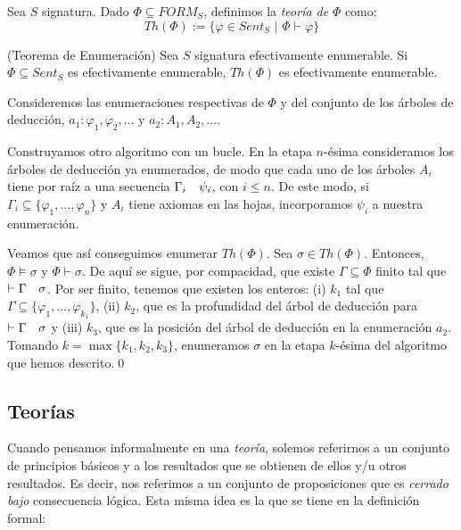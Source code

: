 \begin{definition}
Sea $S$ signatura. Dado $\Phi \subseteq FORM_S$, definimos la \textit{teoría de} $\Phi$ como:
$$Th(\Phi) := \{\varphi \in Sent_S \, \, | \, \, \Phi \vdash \varphi\}$$
\end{definition}

\begin{theorem*}(Teorema de Enumeración)
Sea $S$ signatura efectivamente enumerable. Si $\Phi \subseteq Sent_S$ es efectivamente enumerable, $Th(\Phi)$ es efectivamente enumerable.
\end{theorem*}


\begin{sketchproof}
Consideremos las enumeraciones respectivas de $\Phi$ y del conjunto de los árboles de deducción, $a_1: \varphi_1, \varphi_2, \dots$ y $a_2:A_1, A_2, \dots$.

Construyamos otro algoritmo con un bucle. En la etapa $n$-ésima consideramos los árboles de deducción ya enumerados, de modo que cada uno de los árboles $A_i$ tiene por raíz a una secuencia $\Gamma_i \quad \psi_i$, con $i \leq n$. De este modo, si $\Gamma_i \subseteq \{\varphi_1, \dots, \varphi_n\}$ y $A_i$ tiene axiomas en las hojas, incorporamos $\psi_i$ a nuestra enumeración.

Veamos que así conseguimos enumerar $Th(\Phi)$. Sea $\sigma \in Th(\Phi)$. Entonces, $\Phi \vDash \sigma$ y $\Phi \vdash \sigma$. De aquí se sigue, por compacidad, que existe $\Gamma \subseteq \Phi$ finito tal que $\vdash \Gamma \quad \sigma$. Por ser finito, tenemos que existen los enteros: (i) $k_1$ tal que $\Gamma \subseteq \{\varphi_1, \dots, \varphi_{k_1}\}$, (ii) $k_2$, que es la profundidad del árbol de deducción para $\vdash \Gamma \quad \sigma$ y (iii) $k_3$, que es la posición del árbol de deducción en la enumeración $a_2$.
Tomando $k = \max\{k_1, k_2, k_3\}$, enumeramos $\sigma$ en la etapa $k$-ésima del algoritmo que hemos descrito.\qed
\end{sketchproof}

\subsection{Teorías}

Cuando pensamos informalmente en una \textit{teoría}, solemos referirnos a un conjunto de principios básicos y a los resultados que se obtienen de ellos y/u otros resultados. Es decir, nos referimos a un conjunto de proposiciones que es \textit{cerrado bajo} consecuencia lógica. Esta misma idea es la que se tiene en la definición formal:

